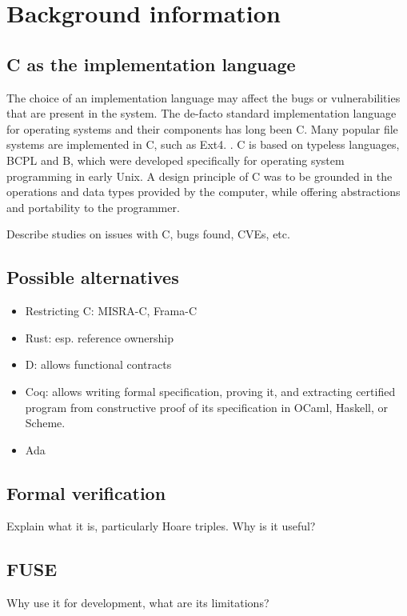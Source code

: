 \section{Background information}
\subsection{C as the implementation language}
The choice of an implementation language may affect the bugs or vulnerabilities that are present in the system.
The de-facto standard implementation language for operating systems and their components has long been C.
Many popular file systems are implemented in C, such as Ext4. \cite{ext4source}.
C is based on typeless languages, BCPL and B, which were developed specifically for operating system programming in early Unix.
A design principle of C was to be grounded in the operations and data types provided by the computer, while offering abstractions and portability to the programmer. \cite{ritchie1993}

Describe studies on issues with C, bugs found, CVEs, etc.

\subsection{Possible alternatives}
\begin{itemize}
  \item Restricting C: MISRA-C, Frama-C
  \item Rust: esp. reference ownership
  \item D: allows functional contracts
  \item Coq: allows writing formal specification, proving it, and extracting certified program from constructive proof of its specification in OCaml, Haskell, or Scheme.
  \item Ada
\end{itemize}

\subsection{Formal verification}
Explain what it is, particularly Hoare triples.
Why is it useful?

\subsection{FUSE}
Why use it for development, what are its limitations?
